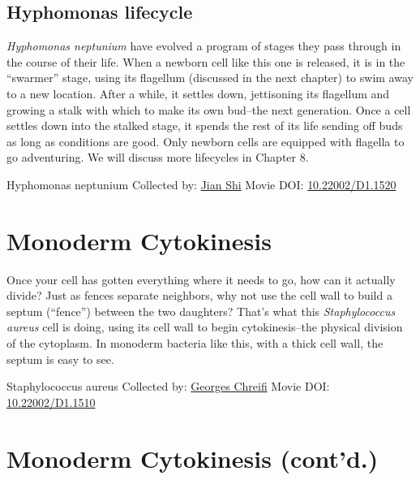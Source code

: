 \documentclass[]{tufte-book}
\begin{document}
\hypertarget{Hyphomonas_lifecycle}{%
\subsection{Hyphomonas lifecycle}\label{Hyphomonas_lifecycle}}

\emph{Hyphomonas neptunium} have evolved a program of stages they pass through in the course of their life. When a newborn cell like this one is released, it is in the ``swarmer'' stage, using its flagellum (discussed in the next chapter) to swim away to a new location. After a while, it settles down, jettisoning its flagellum and growing a stalk with which to make its own bud--the next generation. Once a cell settles down into the stalked stage, it spends the rest of its life sending off buds as long as conditions are good. Only newborn cells are equipped with flagella to go adventuring. We will discuss more lifecycles in Chapter 8.



\hypertarget{htmlwidget-a4479f6bced03a93d170}{}

\label{fig:5-3b}Hyphomonas neptunium Collected by: \protect\hyperlink{jian_shi}{Jian Shi} Movie DOI: \href{https://doi.org/10.22002/D1.1520}{10.22002/D1.1520}

\hypertarget{monoderm-cytokinesis}{%
\section{Monoderm Cytokinesis}\label{monoderm-cytokinesis}}

Once your cell has gotten everything where it needs to go, how can it actually divide? Just as fences separate neighbors, why not use the cell wall to build a septum (``fence'') between the two daughters? That's what this \emph{Staphylococcus aureus} cell is doing, using its cell wall to begin cytokinesis--the physical division of the cytoplasm. In monoderm bacteria like this, with a thick cell wall, the septum is easy to see.



\hypertarget{htmlwidget-bf901d9f152bf8396f87}{}

\label{fig:5-4}Staphylococcus aureus Collected by: \protect\hyperlink{georges_chreifi}{Georges Chreifi} Movie DOI: \href{https://doi.org/10.22002/D1.1510}{10.22002/D1.1510}

\hypertarget{monoderm-cytokinesis-contd.}{%
\section{Monoderm Cytokinesis (cont'd.)}\label{monoderm-cytokinesis-contd.}}
\end{document}
